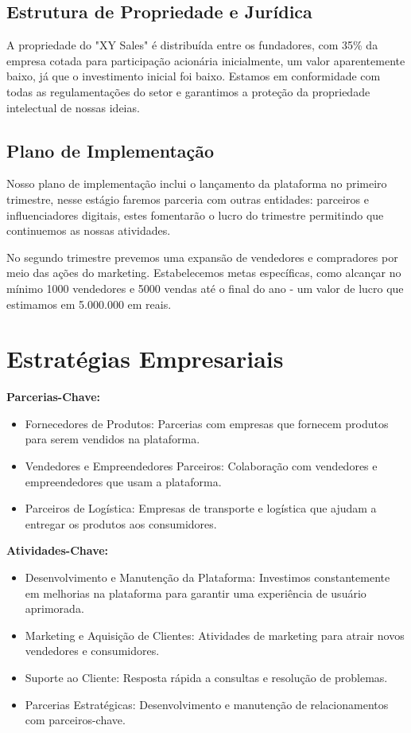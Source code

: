 \documentclass[
	12pt,				%
	openright,			%
	twoside,			%
	a4paper,			%
	english,			%
	brazil				%
	]{abntex2}
\begin{document}
\subsection{Estrutura de Propriedade e Jurídica}

A propriedade do "XY Sales" é distribuída entre os fundadores, com 35\%  da empresa cotada para participação acionária inicialmente, um valor aparentemente baixo, já que o investimento inicial foi baixo. Estamos em conformidade com todas as regulamentações do setor e garantimos a proteção da propriedade intelectual de nossas ideias.

\subsection{Plano de Implementação}

Nosso plano de implementação inclui o lançamento da plataforma no primeiro trimestre, nesse estágio faremos parceria com outras entidades: parceiros e influenciadores digitais, estes fomentarão o lucro do trimestre permitindo que continuemos as nossas atividades.

No segundo trimestre prevemos uma expansão de vendedores e compradores por meio das ações do marketing. Estabelecemos metas específicas, como alcançar no mínimo 1000 vendedores e 5000 vendas até o final do ano - um valor de lucro que estimamos em 5.000.000 em reais.

\section{Estratégias Empresariais}

\textbf{Parcerias-Chave:}
\begin{itemize}
    \item Fornecedores de Produtos: Parcerias com empresas que fornecem produtos para serem vendidos na plataforma.
    \item Vendedores e Empreendedores Parceiros: Colaboração com vendedores e empreendedores que usam a plataforma.
    \item Parceiros de Logística: Empresas de transporte e logística que ajudam a entregar os produtos aos consumidores.
\end{itemize}

\textbf{Atividades-Chave:}
\begin{itemize}
    \item Desenvolvimento e Manutenção da Plataforma: Investimos constantemente em melhorias na plataforma para garantir uma experiência de usuário aprimorada.
    \item Marketing e Aquisição de Clientes: Atividades de marketing para atrair novos vendedores e consumidores.
    \item Suporte ao Cliente: Resposta rápida a consultas e resolução de problemas.
    \item Parcerias Estratégicas: Desenvolvimento e manutenção de relacionamentos com parceiros-chave.
\end{itemize}
\end{document}

